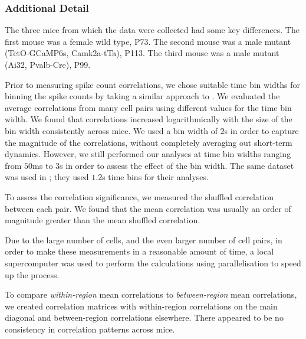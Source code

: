 \documentclass[a4paper,12pt]{article}
\theoremstyle{definition}
\begin{document}
\vspace{-0.5cm}
\subsubsection*{Additional Detail}
\vspace{-0.3cm}
The three mice from which the data were collected had some key differences. The first mouse was a female wild type, P73. The second mouse was a male mutant (TetO-GCaMP6s, Camk2a-tTa), P113. The third mouse was a male mutant (Ai32, Pvalb-Cre), P99.

Prior to measuring spike count correlations, we chose suitable time bin widths for binning the spike counts by taking a similar approach to \cite{cohen2}. We evaluated the average correlations from many cell pairs using different values for the time bin width. We found that correlations increased logarithmically with the size of the bin width consistently across mice. We used a bin width of $2$s in order to capture the magnitude of the correlations, without completely averaging out short-term dynamics. However, we still performed our analyses at time bin widths ranging from $50$ms to $3$s in order to assess the effect of the bin width. The same dataset was used in \cite{stringer}; they used $1.2$s time bins for their analyses.

To assess the correlation significance, we measured the shuffled correlation between each pair. We found that the mean correlation was usually an order of magnitude greater than the mean shuffled correlation. 

Due to the large number of cells, and the even larger number of cell pairs, in order to make these measurements in a reasonable amount of time, a local supercomputer was used to perform the calculations using parallelisation to speed up the process.

To compare \textit{within-region} mean correlations to \textit{between-region} mean correlations, we created correlation matrices with within-region correlations on the main diagonal and between-region correlations elsewhere. There appeared to be no consistency in correlation patterns across mice. %

\end{document}
